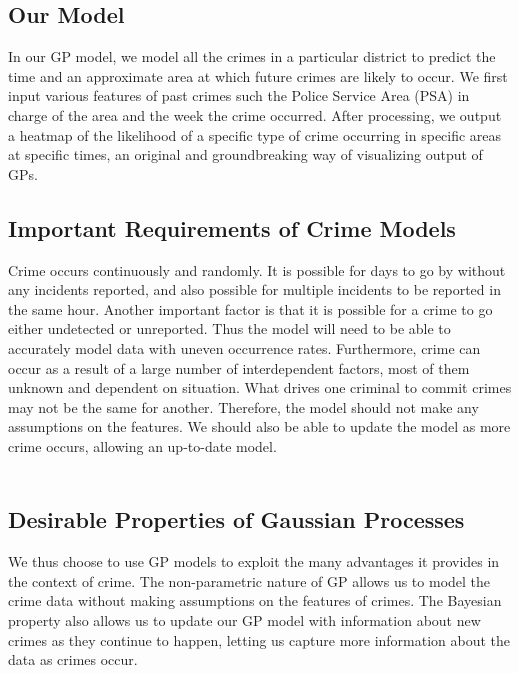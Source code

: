 \documentclass[letterpaper]{article}
\begin{document}
	\subsection{Our Model}
	
	In our GP model, we model all the crimes in a particular district to predict the time and an approximate area at which future crimes are likely to occur.
	We first input various features of past crimes such the Police Service Area (PSA) in charge of the area and the week the crime occurred.
	After processing, we output a heatmap of the likelihood of a specific type of crime occurring in specific areas at specific times, an original and groundbreaking way of visualizing output of GPs.
	
	\subsection{Important Requirements of Crime Models}
	
	Crime occurs continuously and randomly. It is possible for days to go by without any incidents reported, and also possible for multiple incidents to be reported in the same hour.
	Another important factor is that it is possible for a crime to go either undetected or unreported. Thus the model will need to be able to accurately model data with uneven occurrence rates.
	Furthermore, crime can occur as a result of a large number of interdependent factors, most of them unknown and dependent on situation. What drives one criminal to commit crimes may not be the same for another.
	Therefore, the model should not make any assumptions on the features. We should also be able to update the model as more crime occurs, allowing an up-to-date model.\\ \\
	
	\subsection{Desirable Properties of Gaussian Processes}
	
	We thus choose to use GP models to exploit the many advantages it provides in the context of crime.
	The non-parametric nature of GP allows us to model the crime data without making assumptions on the features of crimes.
	The Bayesian property also allows us to update our GP model with information about new crimes as they continue to happen, letting us capture more information about the data as crimes occur.\\ \\
\end{document}
